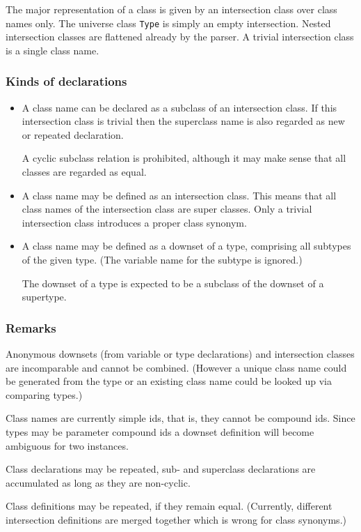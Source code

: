 \documentclass{article}
\begin{document}
The major representation of a class is given by an intersection class over
class names only. The universe class \texttt{Type} is simply an empty
intersection. Nested intersection classes are flattened already by the
parser. A trivial intersection class is a single class name.

\subsubsection*{Kinds of declarations}
\begin{itemize}
\item A class name can be declared as a subclass of an intersection class. If
  this intersection class is trivial then the superclass name is also regarded
  as new or repeated declaration.
  
  A cyclic subclass relation is prohibited, although it may make sense
  that all classes are regarded as equal.
\item A class name may be defined as an intersection class. This means that
  all class names of the intersection class are super classes. Only a trivial
  intersection class introduces a proper class synonym.
\item A class name may be defined as a downset of a type, comprising all
  subtypes of the given type. (The variable name for the subtype is ignored.)
  
  The downset of a type is expected to be a subclass of the downset of a
  supertype.
\end{itemize}

\subsubsection*{Remarks}

Anonymous downsets (from variable or type declarations) and intersection
classes are incomparable and cannot be combined. (However a unique class name
could be generated from the type or an existing class name could be looked up
via comparing types.)

Class names are currently simple ids, that is, they cannot be compound ids.
Since types may be parameter compound ids a downset definition will become
ambiguous for two instances.

Class declarations may be repeated, sub- and superclass declarations are
accumulated as long as they are non-cyclic.

Class definitions may be repeated, if they remain equal. (Currently, different
intersection definitions are merged together which is wrong for class
synonyms.) 
\end{document}

